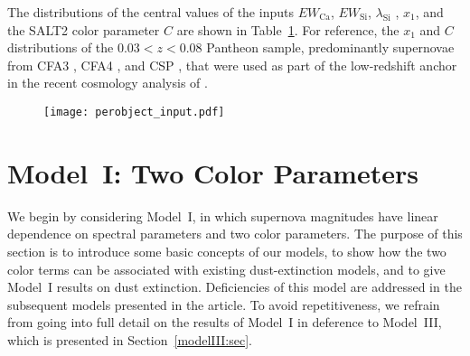 \documentclass[trackchanges]{aastex62}   	%
\begin{document}
{The distributions of the central values of the inputs  $EW_{\mathrm{Ca}}$, $EW_{\mathrm{Si}}$,
$\lambda_{\mathrm{Si}}$ , $x_1$, and the SALT2 color parameter $C$ are shown in Table~\ref{input:fig}.
For reference, the $x_1$ and $C$ distributions of the $0.03<z< 0.08$ Pantheon sample,
predominantly supernovae from CFA3 \citep{2009ApJ...700..331H}, CFA4 \citep{2012ApJS..200...12H}, and CSP
\citep{2010AJ....139..519C, 2011AJ....142..156S}, that were used as part of the low-redshift anchor in the recent cosmology analysis of \citet{2017arXiv171000845S}.

\begin{figure}[htbp] %
   \centering
   \texttt{[image: perobject\_input.pdf]}
   \caption{
   \label{input:fig}}
\end{figure}
}

\section{Model~I: Two Color Parameters}
\label{modelI:sec}
We begin by considering Model~I, in which supernova magnitudes  have linear dependence on spectral parameters
and two color parameters. The purpose of this section is to introduce some basic concepts of our models,
to show how the two  color terms can be associated with existing dust-extinction models, and to give Model~I results on dust extinction.
Deficiencies of this model are addressed in the subsequent models presented in the article.
To avoid repetitiveness,
we refrain from going into full detail on the results of Model~I in deference to Model~III, which is presented in Section~\ref{modelIII:sec}.

\end{document}
